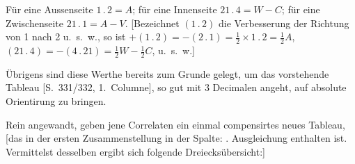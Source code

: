 \par\noindent\hspace*{\parindent}Für eine Aussenseite \(1\, .\,2=A\); für eine Innenseite \(21\, .\,4=W-C\); für
eine Zwischenseite \(21\, .\,1=A-V\). [Bezeichnet \((1\, .\,2)\) die Verbesserung der
Richtung von 1 nach 2 u.\ s.\ w., so ist \(+(1\, .\,2)=-(2\, .\,1)=\frac12\times1\, .\,2=\frac12A\),
\((21\, .\,4)=-(4\, .\,21)=\frac12W-\frac12C\), u.\ s.\ w.]

\par\noindent\hspace*{\parindent}Übrigens sind diese Werthe bereits zum Grunde gelegt, um das vorstehende
Tableau [S.\ 331/332, 1.\ Columne], so gut mit 3 Decimalen angeht,
auf absolute Orientirung zu bringen.

\par\noindent\hspace*{\parindent}Rein angewandt, geben jene Correlaten ein einmal compensirtes neues Tableau,
[das in der ersten Zusammenstellung in der Spalte: . Ausgleichung\guillemotleft{}
enthalten ist. Vermittelst desselben ergibt sich folgende Dreiecksübersicht:]
